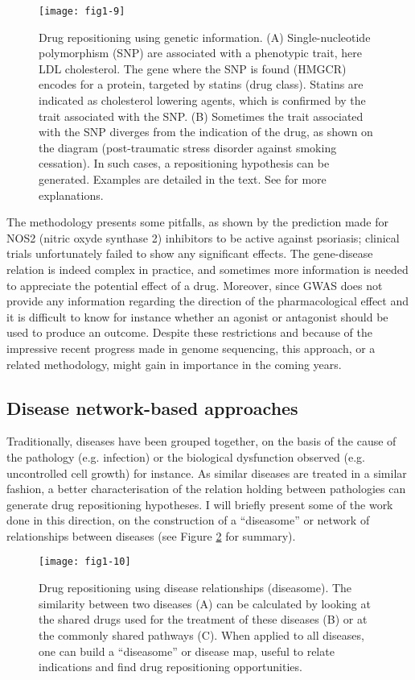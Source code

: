 \begin{figure}[ht]
    \centering
    \texttt{[image: fig1-9]}
    \caption{Drug repositioning using genetic information. (A) Single-nucleotide polymorphism (SNP) are associated with a phenotypic trait, here LDL cholesterol. The gene where the SNP is found (HMGCR) encodes for a protein, targeted by statins (drug class). Statins are indicated as cholesterol lowering agents, which is confirmed by the trait associated with the SNP. (B) Sometimes the trait associated with the SNP diverges from the indication of the drug, as shown on the diagram (post-traumatic stress disorder against smoking cessation). In such cases, a repositioning hypothesis can be generated. Examples are detailed in the text. See \cite{sanseau2012use} for more explanations.}
    \label{fig1-9}
\end{figure}

The methodology presents some pitfalls, as shown by the prediction made for NOS2 (nitric oxyde synthase 2) inhibitors to be active against psoriasis; clinical trials unfortunately failed to show any significant effects. The gene-disease relation is indeed complex in practice, and sometimes more information is needed to appreciate the potential effect of a drug. Moreover, since GWAS does not provide any information regarding the direction of the pharmacological effect and it is difficult to know for instance whether an agonist or antagonist should be used to produce an outcome. Despite these restrictions and because of the impressive recent progress made in genome sequencing, this approach, or a related methodology, might gain in importance in the coming years.

\subsection{Disease network-based approaches}

Traditionally, diseases have been grouped together, on the basis of the cause of the pathology (e.g. infection) or the biological dysfunction observed (e.g. uncontrolled cell growth) for instance. As similar diseases are treated in a similar fashion, a better characterisation of the relation holding between pathologies can generate drug repositioning hypotheses. I will briefly present some of the work done in this direction, on the construction of a “diseasome” or network of relationships between diseases (see Figure \ref{fig1-10} for summary).

\begin{figure}[ht]
    \centering
    \texttt{[image: fig1-10]}
    \caption{Drug repositioning using disease relationships (diseasome). The similarity between two diseases (A) can be calculated by looking at the shared drugs used for the treatment of these diseases (B) or at the commonly shared pathways (C). When applied to all diseases, one can build a “diseasome” or disease map, useful to relate indications and find drug repositioning opportunities.}
    \label{fig1-10}
\end{figure}

